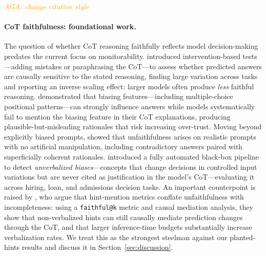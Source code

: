 \documentclass{article}
\newcommand{\agacomment}[1]{\textcolor{orange}{\textit{AGA: #1}}}
\begin{document}
\agacomment{change citation style}

\paragraph{CoT faithfulness: foundational work.}
The question of whether CoT reasoning faithfully reflects model decision-making predates the current focus on monitorability. \citet{lanham2023measuring} introduced intervention-based tests---adding mistakes or paraphrasing the CoT---to assess whether predicted answers are causally sensitive to the stated reasoning, finding large variation across tasks and reporting an inverse scaling effect: larger models often produce \emph{less} faithful reasoning. \citet{turpin2023language} demonstrated that biasing features---including multiple-choice positional patterns---can strongly influence answers while models systematically fail to mention the biasing feature in their CoT explanations, producing plausible-but-misleading rationales that risk increasing over-trust. Moving beyond explicitly biased prompts, \citet{arcuschin2025wild} showed that unfaithfulness arises on realistic prompts with no artificial manipulation, including contradictory answers paired with superficially coherent rationales. \citet{arcuschin2026biases} introduced a fully automated black-box pipeline to detect \emph{unverbalized biases}---concepts that change decisions in controlled input variations but are never cited as justification in the model's CoT---evaluating it across hiring, loan, and admissions decision tasks. An important counterpoint is raised by \citet{zaman2025cot}, who argue that hint-mention metrics conflate unfaithfulness with incompleteness: using a \texttt{faithful@k} metric and causal mediation analysis, they show that non-verbalized hints can still causally mediate prediction changes through the CoT, and that larger inference-time budgets substantially increase verbalization rates. We treat this as the strongest steelman against our planted-hints results and discuss it in Section~\ref{sec:discussion}.
\end{document}
